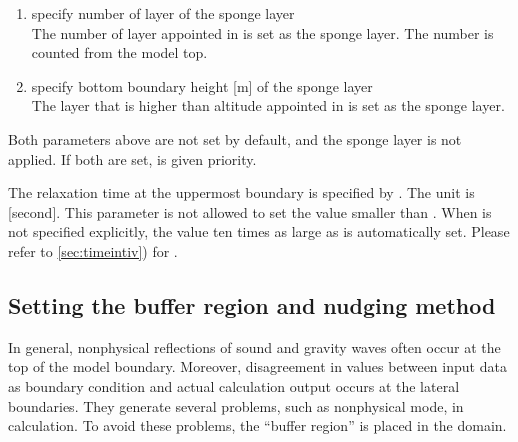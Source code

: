 \begin{enumerate}
\item specify number of layer of the sponge layer \\
  The number of layer appointed in  is set as the sponge layer. The number is counted from the model top.
\item specify bottom boundary height [m] of the sponge layer \\
  The layer that is higher than altitude appointed in  is set as the sponge layer.
\end{enumerate}

Both parameters above are not set by default, and the sponge layer is not applied. If both are set,  is given priority.

The relaxation time at the uppermost boundary is specified by . The unit is [second]. This parameter is not allowed to set the value smaller than . When  is not specified explicitly, the value ten times as large as  is automatically set. Please refer to \ref{sec:timeintiv}) for .

\subsection{Setting the buffer region and nudging method} \label{subsec:buffer}

In general,
nonphysical reflections of sound and gravity waves often occur at the top of the model boundary.
Moreover, disagreement in values between input data as boundary condition and actual calculation output occurs at the lateral boundaries. They generate several problems, such as nonphysical mode, in calculation.
To avoid these problems, the ``buffer region'' is placed in the domain.

